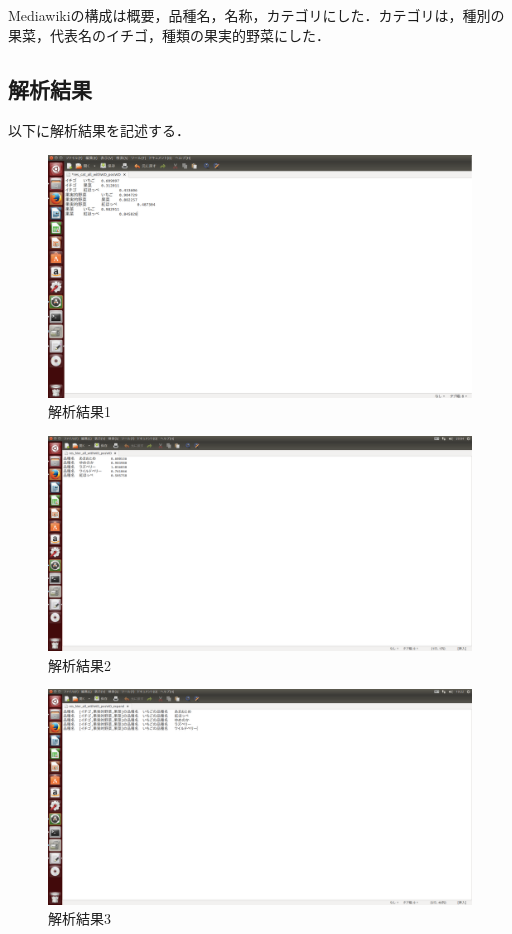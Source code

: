 Mediawikiの構成は概要，品種名，名称，カテゴリにした．カテゴリは，種別の果菜，代表名のイチゴ，種類の果実的野菜にした．

\subsection{解析結果}
以下に解析結果を記述する．

\begin{figure}[!ht]
\centering
\includegraphics[width=18cm]{kekka}
\caption{解析結果1}\label{kekka}
\end{figure}



\begin{figure}[!htb]
\centering
\includegraphics[width=17cm]{kekka2}
\caption{解析結果2}\label{kekka2}
\end{figure}



\begin{figure}[!htb]
\centering
\includegraphics[width=18cm]{kekka3}
\caption{解析結果3}\label{kekka3}
\end{figure}

